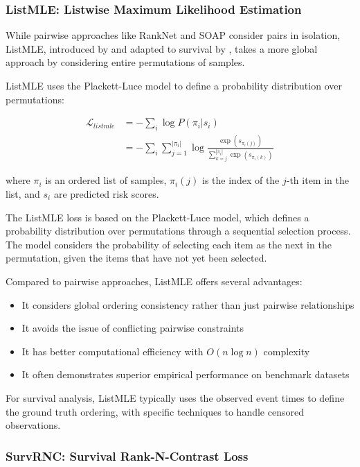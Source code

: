 \subsubsection{ListMLE: Listwise Maximum Likelihood Estimation}

While pairwise approaches like RankNet and SOAP consider pairs in isolation, ListMLE, introduced by \textcite{xia2008} and adapted to survival by \textcite{kvamme2019}, takes a more global approach by considering entire permutations of samples.

\begin{definitionbox}[title=ListMLE Loss]
  ListMLE uses the Plackett-Luce model to define a probability distribution over permutations:

  \begin{align}
    \mathcal{L}_{listmle} &= -\sum_i \log P(\pi_i | s_i) \\
    &= -\sum_i \sum_{j=1}^{|\pi_i|} \log \frac{\exp(s_{\pi_i(j)})}{\sum_{k=j}^{|\pi_i|} \exp(s_{\pi_i(k)})}
  \end{align}

  where $\pi_i$ is an ordered list of samples, $\pi_i(j)$ is the index of the $j$-th item in the list, and $s_i$ are predicted risk scores.
\end{definitionbox}

The ListMLE loss is based on the Plackett-Luce model, which defines a probability distribution over permutations through a sequential selection process. The model considers the probability of selecting each item as the next in the permutation, given the items that have not yet been selected.

Compared to pairwise approaches, ListMLE offers several advantages:
\begin{itemize}
\item It considers global ordering consistency rather than just pairwise relationships
\item It avoids the issue of conflicting pairwise constraints
\item It has better computational efficiency with $O(n \log n)$ complexity
\item It often demonstrates superior empirical performance on benchmark datasets
\end{itemize}

For survival analysis, ListMLE typically uses the observed event times to define the ground truth ordering, with specific techniques to handle censored observations.

\subsubsection{SurvRNC: Survival Rank-N-Contrast Loss}

